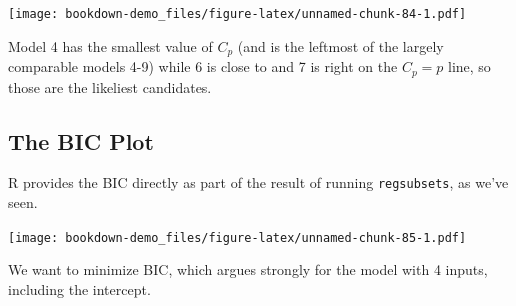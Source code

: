 \documentclass[]{book}
\newenvironment{Shaded}{\begin{snugshade}}{\end{snugshade}}
\newcommand{\KeywordTok}[1]{\textcolor[rgb]{0.13,0.29,0.53}{\textbf{#1}}}
\newcommand{\DataTypeTok}[1]{\textcolor[rgb]{0.13,0.29,0.53}{#1}}
\newcommand{\DecValTok}[1]{\textcolor[rgb]{0.00,0.00,0.81}{#1}}
\newcommand{\FloatTok}[1]{\textcolor[rgb]{0.00,0.00,0.81}{#1}}
\newcommand{\StringTok}[1]{\textcolor[rgb]{0.31,0.60,0.02}{#1}}
\newcommand{\OperatorTok}[1]{\textcolor[rgb]{0.81,0.36,0.00}{\textbf{#1}}}
\newcommand{\NormalTok}[1]{#1}
\theoremstyle{definition}
\theoremstyle{definition}
\theoremstyle{definition}
\theoremstyle{remark}
\begin{document}
\begin{Shaded}
\end{Shaded}

\texttt{[image: bookdown-demo\_files/figure-latex/unnamed-chunk-84-1.pdf]}

Model 4 has the smallest value of \(C_p\) (and is the leftmost of the
largely comparable models 4-9) while 6 is close to and 7 is right on the
\(C_p = p\) line, so those are the likeliest candidates.

\subsection{The BIC Plot}\label{the-bic-plot-1}

R provides the BIC directly as part of the result of running
\texttt{regsubsets}, as we've seen.

\begin{Shaded}
\end{Shaded}

\texttt{[image: bookdown-demo\_files/figure-latex/unnamed-chunk-85-1.pdf]}

We want to minimize BIC, which argues strongly for the model with 4
inputs, including the intercept.
\end{document}
